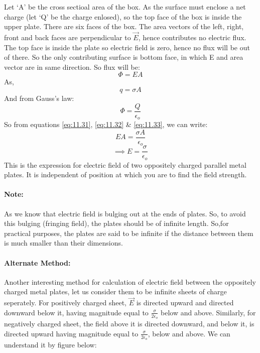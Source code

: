 Let ‘A’ be the cross sectioal area of the box. As the surface
must enclose a net charge (let ‘Q’ be the charge enlosed),
so the top face of the box is inside the upper plate.
There are six faces of the box. The area vectors of the left, right,
front and back faces are perpendicular to $\vec{E}$, hence contributes
no electric flux. The top face is inside the plate so electric field is
zero, hence no flux will be out of there. So the only contributing surface
is bottom face, in which E and area vector are in same direction.
So flux will be:
\begin{equation}\label{eq:11.31}
  \Phi = EA 
\end{equation}
As, 
\begin{equation}\label{eq:11.32}
  q = \sigma A
\end{equation}
And from Gauss’s law:
\begin{equation}\label{eq:11.33}
  \Phi = \frac{Q}{\epsilon_{o}}
\end{equation}
So from equations \ref{eq:11.31}, \ref{eq:11.32} \& \ref{eq:11.33}, we can
write:
\begin{equation}
  EA = \frac{\sigma A}{\epsilon_{o}} \nonumber
\end{equation}
\begin{equation}\label{eq:11.34}
  \implies E = \frac{\sigma}{\epsilon_{o}}
\end{equation}
This is the expression for electric field of two oppositely charged
parallel metal plates. It is independent of position at which you
are to find the field strength.
\paragraph{Note:}
As we know that electric field is bulging out at the ends of plates.
So, to avoid this bulging (fringing field),
the plates should be of infinite length. So,for practical purposes,
the plates are said to be infinite if the distance between them is
much smaller than their dimensions.
\paragraph{Alternate Method:}
Another interesting method for calculation of electric field between
the oppositely charged metal plates, let us consider them to be infinite
sheets of charge seperately. For positively charged sheet, $\vec{E}$
is directed upward and directed downward below it,
having magnitude equal to $\frac{\sigma}{2\epsilon_{o}}$ below and above.
Similarly, for negatively charged sheet, the field above it is directed downward,
and below it, is directed upward having magnitude equal to $\frac{\sigma}{2\epsilon_{o}}$,
below and above. We can understand it by figure below:

